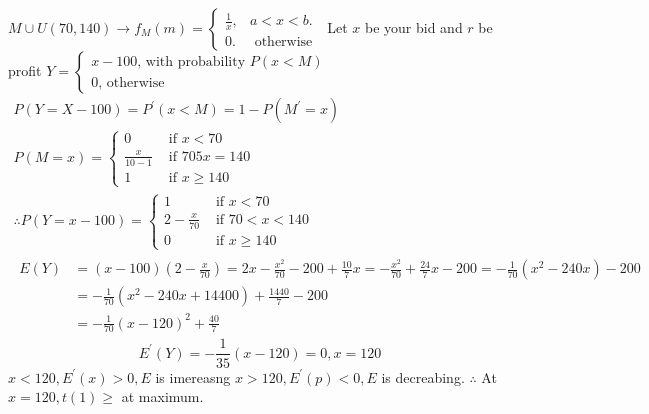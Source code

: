 $M \cup U(70,140) \rightarrow f_{M}(m)=\left\{\begin{array}{ll}\frac{1}{x}, & a<x<b . \\ 0 . & \text { otherwise }\end{array}\right.$
Let $x$ be your bid and $r$ be profit
$Y=\left\{\begin{array}{l}x-100 \text {, with probability } P(x<M) \\ 0 \text {, otherwise }\end{array}\right.$
\[
\begin{array}{l}
P(Y=X-100)=P^{\prime}(x<M)=1-P\left(M^{\prime}=x\right) \\
P(M=x)=\left\{\begin{array}{ll}
0 & \text { if } x<70 \\
\frac{x}{10-1} & \text { if } 705 x=140 \\
1 & \text { if } x \geqslant 140
\end{array}\right. \\
\therefore P(Y=x-100)=\left\{\begin{array}{ll}
1 & \text { if } x<70 \\
2-\frac{x}{70} & \text { if } 70<x<140 \\
0 & \text { if } x \geqslant 140
\end{array}\right. \\
\begin{aligned}
E(Y) &=(x-100)\left(2-\frac{x}{70}\right)=2 x-\frac{x^{2}}{70}-200+\frac{10}{7} x=-\frac{x^{2}}{70}+\frac{24}{7} x-200=-\frac{1}{70}\left(x^{2}-240 x\right)-200 \\
&=-\frac{1}{70}\left(x^{2}-240 x+14400\right)+\frac{1440}{7}-200 \\
&=-\frac{1}{70}(x-120)^{2}+\frac{40}{7}
\end{aligned}
\end{array}
\]
\[
E^{\prime}(Y)=-\frac{1}{35}(x-120)=0, x=120
\]
$x<120, E^{\prime}(x)>0, E$ is imereasng
$x>120, E^{\prime}(p)<0, E$ is decreabing.
$\therefore$ At $x=120, t(1) \geq$ at maximum.